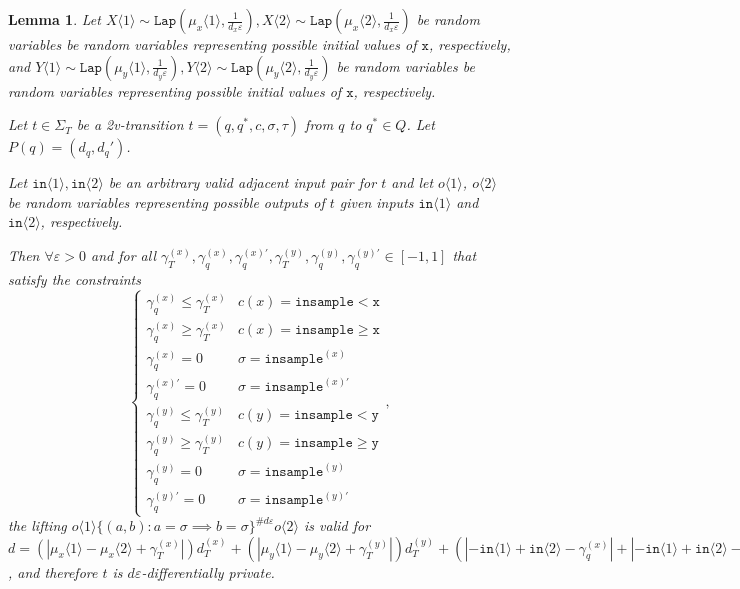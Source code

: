 \documentclass[12pt]{article}
\newcommand{\gguard}[1][x]{\texttt{insample}\geq #1}
\newcommand{\lguard}[1][x]{\texttt{insample} < #1}
\newcommand{\brangle}[1]{\langle #1 \rangle}
\newcommand{\Lap}{\texttt{Lap}}
\newtheorem{lemma}[thm]{Lemma}
\theoremstyle{definition}
\begin{document}
\begin{lemma}
    Let $X\brangle{1}\sim \Lap(\mu_x\brangle{1}, \frac{1}{d_x\varepsilon}), X\brangle{2}\sim\Lap(\mu_x\brangle{2}, \frac{1}{d_x\varepsilon})$ be random variables be random variables representing possible initial values of $\texttt{x}$, respectively, 
    and $Y\brangle{1}\sim \Lap(\mu_y\brangle{1}, \frac{1}{d_y\varepsilon}), Y\brangle{2}\sim\Lap(\mu_y\brangle{2}, \frac{1}{d_y\varepsilon})$ be random variables be random variables representing possible initial values of $\texttt{x}$, respectively. 

    Let $t\in \Sigma_T$ be a 2v-transition $t = (q, q^*, c, \sigma, \tau)$ from $q$ to $q^*\in Q$. Let $P(q) = (d_q, d_q')$.

    Let $\texttt{in}\brangle{1}, \texttt{in}\brangle{2}$ be an arbitrary valid adjacent input pair for $t$ and let $o\brangle{1}$, $o\brangle{2}$ be random variables representing possible outputs of $t$ given inputs $\texttt{in}\brangle{1}$ and $\texttt{in}\brangle{2}$, respectively. 

    Then $\forall \varepsilon>0$ and for all $\gamma_T^{(x)}, \gamma_q^{(x)}, \gamma_q^{(x)\prime},\gamma_T^{(y)}, \gamma_q^{(y)}, \gamma_q^{(y)\prime}\in [-1, 1]$ that satisfy the constraints \[
        \begin{cases}
          \gamma_q^{(x)}\leq\gamma_T^{(x)} & c(x) = \lguard[\texttt{x}]\\
          \gamma_q^{(x)}\geq\gamma_T^{(x)} & c(x) = \gguard[\texttt{x}]\\
          \gamma_q^{(x)}=0 & \sigma = \texttt{insample}^{(x)}\\
          \gamma_q^{(x)\prime}=0 & \sigma = \texttt{insample}^{(x)\prime}\\
          \gamma_q^{(y)}\leq\gamma_T^{(y)} & c(y) = \lguard[\texttt{y}]\\
          \gamma_q^{(y)}\geq\gamma_T^{(y)} & c(y) = \gguard[\texttt{y}]\\
          \gamma_q^{(y)}=0 & \sigma = \texttt{insample}^{(y)}\\
          \gamma_q^{(y)\prime}=0 & \sigma = \texttt{insample}^{(y)\prime}
        \end{cases},
      \]
      the lifting $o\brangle{1}\{(a, b): a=\sigma\implies b=\sigma\}^{\#d\varepsilon}o\brangle{2}$ is valid for 
      $d = (|\mu_x\brangle{1}-\mu_x\brangle{2}+\gamma_T^{(x)}|)d_T^{(x)}+(|\mu_y\brangle{1}-\mu_y\brangle{2}+\gamma_T^{(y)}|)d_T^{(y)}+(|-\texttt{in}\brangle{1}+\texttt{in}\brangle{2}-\gamma_q^{(x)}|+|-\texttt{in}\brangle{1}+\texttt{in}\brangle{2}-\gamma_q^{(y)}|)d_q+(|-\texttt{in}\brangle{1}+\texttt{in}\brangle{2}-\gamma_q^{(x)\prime}|+|-\texttt{in}\brangle{1}+\texttt{in}\brangle{2}-\gamma_q^{(y)\prime}|)d_q'$, and therefore $t$ is $d\varepsilon$-differentially private. 
\end{lemma}
\end{document}
